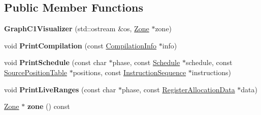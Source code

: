 \subsection*{Public Member Functions}
\begin{DoxyCompactItemize}
\item 
{\bfseries Graph\+C1\+Visualizer} (std\+::ostream \&os, \hyperlink{classv8_1_1internal_1_1_zone}{Zone} $\ast$zone)\hypertarget{classv8_1_1internal_1_1compiler_1_1_graph_c1_visualizer_a60c8399fb60170f273da9f7b92f6294a}{}\label{classv8_1_1internal_1_1compiler_1_1_graph_c1_visualizer_a60c8399fb60170f273da9f7b92f6294a}

\item 
void {\bfseries Print\+Compilation} (const \hyperlink{classv8_1_1internal_1_1_compilation_info}{Compilation\+Info} $\ast$info)\hypertarget{classv8_1_1internal_1_1compiler_1_1_graph_c1_visualizer_a453875874955b1d953ae12c3483c2246}{}\label{classv8_1_1internal_1_1compiler_1_1_graph_c1_visualizer_a453875874955b1d953ae12c3483c2246}

\item 
void {\bfseries Print\+Schedule} (const char $\ast$phase, const \hyperlink{classv8_1_1internal_1_1compiler_1_1_schedule}{Schedule} $\ast$schedule, const \hyperlink{classv8_1_1internal_1_1compiler_1_1_source_position_table}{Source\+Position\+Table} $\ast$positions, const \hyperlink{classv8_1_1internal_1_1compiler_1_1_instruction_sequence}{Instruction\+Sequence} $\ast$instructions)\hypertarget{classv8_1_1internal_1_1compiler_1_1_graph_c1_visualizer_a3284f03562859b8e7452ad822ecc9ae4}{}\label{classv8_1_1internal_1_1compiler_1_1_graph_c1_visualizer_a3284f03562859b8e7452ad822ecc9ae4}

\item 
void {\bfseries Print\+Live\+Ranges} (const char $\ast$phase, const \hyperlink{classv8_1_1internal_1_1compiler_1_1_register_allocation_data}{Register\+Allocation\+Data} $\ast$data)\hypertarget{classv8_1_1internal_1_1compiler_1_1_graph_c1_visualizer_a52057023036222084e4fa0036486b0ad}{}\label{classv8_1_1internal_1_1compiler_1_1_graph_c1_visualizer_a52057023036222084e4fa0036486b0ad}

\item 
\hyperlink{classv8_1_1internal_1_1_zone}{Zone} $\ast$ {\bfseries zone} () const \hypertarget{classv8_1_1internal_1_1compiler_1_1_graph_c1_visualizer_adecbc6c3eb983b3d37966a0e74c402ad}{}\label{classv8_1_1internal_1_1compiler_1_1_graph_c1_visualizer_adecbc6c3eb983b3d37966a0e74c402ad}

\end{DoxyCompactItemize}
